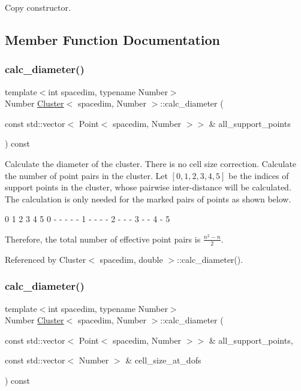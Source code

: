 Copy constructor. 

\subsection{Member Function Documentation}
\mbox{\label{classCluster_a2204e6b5cf593d9e93a56f9269d74b4c}} 
\subsubsection{\texorpdfstring{calc\+\_\+diameter()}{calc\_diameter()}\hspace{0.1cm}{\footnotesize\ttfamily [1/2]}}
{\footnotesize\ttfamily template$<$int spacedim, typename Number$>$ \\
Number \hyperlink{classCluster}{Cluster}$<$ spacedim, Number $>$\+::calc\+\_\+diameter (\begin{DoxyParamCaption}\item[{const std\+::vector$<$ Point$<$ spacedim, Number $>$$>$ \&}]{all\+\_\+support\+\_\+points }\end{DoxyParamCaption}) const}

Calculate the diameter of the cluster. There is no cell size correction. Calculate the number of point pairs in the cluster. Let $[0, 1, 2, 3, 4, 5]$ be the indices of support points in the cluster, whose pairwise inter-\/distance will be calculated. The calculation is only needed for the marked pairs of points as shown below.


\begin{DoxyCode}
  0 1 2 3 4 5
0   - - - - -
1     - - - -
2       - - -
3         - -
4           -
5
\end{DoxyCode}


Therefore, the total number of effective point pairs is $\frac{n^2 - n}{2}$.

Referenced by Cluster$<$ spacedim, double $>$\+::calc\+\_\+diameter().

\mbox{\label{classCluster_ab9900a870bdd05d4638b820716e03293}} 
\subsubsection{\texorpdfstring{calc\+\_\+diameter()}{calc\_diameter()}\hspace{0.1cm}{\footnotesize\ttfamily [2/2]}}
{\footnotesize\ttfamily template$<$int spacedim, typename Number$>$ \\
Number \hyperlink{classCluster}{Cluster}$<$ spacedim, Number $>$\+::calc\+\_\+diameter (\begin{DoxyParamCaption}\item[{const std\+::vector$<$ Point$<$ spacedim, Number $>$$>$ \&}]{all\+\_\+support\+\_\+points,  }\item[{const std\+::vector$<$ Number $>$ \&}]{cell\+\_\+size\+\_\+at\+\_\+dofs }\end{DoxyParamCaption}) const}

